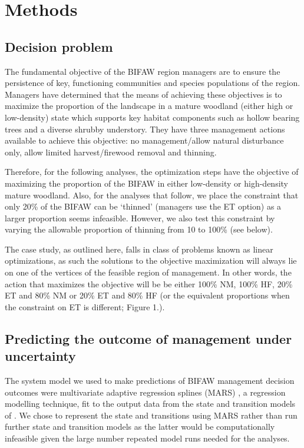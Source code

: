 \documentclass[]{article}
\begin{document}
\section{Methods}\label{methods}

\subsection{Decision problem}\label{decision-problem}

The fundamental objective of the BIFAW region managers are to ensure the
persistence of key, functioning communities and species populations of
the region. Managers have determined that the means of achieving these
objectives is to maximize the proportion of the landscape in a mature
woodland (either high or low-density) state which supports key habitat
components such as hollow bearing trees and a diverse shrubby
understory. They have three management actions available to achieve this
objective: no management/allow natural disturbance only, allow limited
harvest/firewood removal and thinning.

Therefore, for the following analyses, the optimization steps have the
objective of maximizing the proportion of the BIFAW in either
low-density or high-density mature woodland. Also, for the analyses that
follow, we place the constraint that only 20\% of the BIFAW can be
`thinned' (managers use the ET option) as a larger proportion seems
infeasible. However, we also test this constraint by varying the
allowable proportion of thinning from 10 to 100\% (see below).

The case study, as outlined here, falls in class of problems known as
linear optimizations, as such the solutions to the objective
maximization will always lie on one of the vertices of the feasible
region of management. In other words, the action that maximizes the
objective will be be either 100\% NM, 100\% HF, 20\% ET and 80\% NM or
20\% ET and 80\% HF (or the equivalent proportions when the constraint
on ET is different; Figure 1.).

\subsection{Predicting the outcome of management under
uncertainty}\label{predicting-the-outcome-of-management-under-uncertainty}

The system model we used to make predictions of BIFAW management
decision outcomes were multivariate adaptive regression splines (MARS)
\citep{Friedman1991}, a regression modelling technique, fit to the
output data from the state and transition models of \citet{Czembor2011}.
We chose to represent the state and transitions using MARS rather than
run further state and transition models as the latter would be
computationally infeasible given the large number repeated model runs
needed for the analyses.
\end{document}
